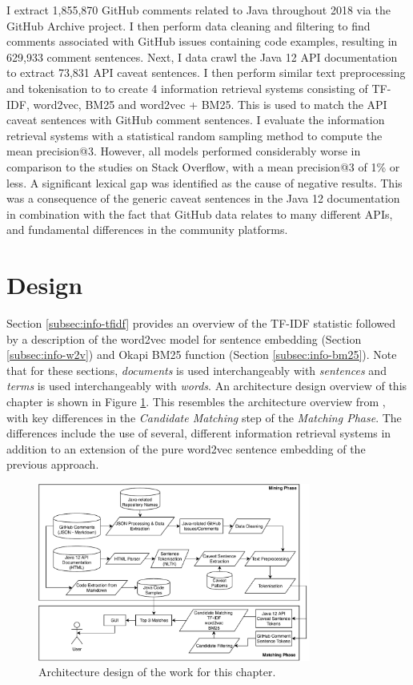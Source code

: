 I extract 1,855,870 GitHub comments related to Java throughout 2018 via the GitHub Archive project. I then perform data cleaning and filtering to find comments associated with GitHub issues containing code examples, resulting in 629,933 comment sentences. Next, I data crawl the Java 12 API documentation to extract 73,831 API caveat sentences. I then perform similar text preprocessing and tokenisation to \cite{jiamou} to create 4 information retrieval systems consisting of TF-IDF, word2vec, BM25 and word2vec + BM25. This is used to match the API caveat sentences with GitHub comment sentences. I evaluate the information retrieval systems with a statistical random sampling method to compute the mean precision@3. However, all models performed considerably worse in comparison to the studies on Stack Overflow, with a mean precision@3 of 1\% or less. A significant lexical gap was identified as the cause of negative results. This was a consequence of the generic caveat sentences in the Java 12 documentation in combination with the fact that GitHub data relates to many different APIs, and fundamental differences in the community platforms.

\section{Design}
\label{sec:info-design}
Section \ref{subsec:info-tfidf} provides an overview of the TF-IDF statistic followed by a description of the word2vec model for sentence embedding (Section \ref{subsec:info-w2v}) and Okapi BM25 function (Section \ref{subsec:info-bm25}). Note that for these sections, \textit{documents} is used interchangeably with \textit{sentences} and \textit{terms} is used interchangeably with \textit{words}. An architecture design overview of this chapter is shown in Figure \ref{fig:github-architecture}. This resembles the architecture overview from \cite{jiamou}, with key differences in the \textit{Candidate Matching} step of the \textit{Matching Phase}. The differences include the use of several, different information retrieval systems in addition to an extension of the pure word2vec sentence embedding of the previous approach.

\begin{figure}
	\label{fig:github-architecture}
	\centering
	\includegraphics[width=0.8\textwidth]{figs/github-architecture.pdf}
	\caption{Architecture design of the work for this chapter.}
\end{figure}

